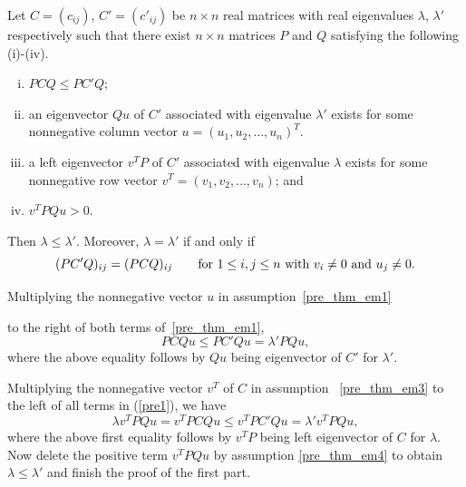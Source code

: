 \documentclass{beamer}
\begin{document}
\begin{frame}
    \begin{theorem}
        \label{pre_thm}
        Let $C=(c_{ij})$, $C'=(c'_{ij})$  be $n\times n$ real matrices
         with real eigenvalues $\lambda$, $\lambda'$ respectively such
         that there exist $n\times n$ matrices $P$ and $Q$   satisfying the following (i)-(iv).
    \begin{enumerate}[(i)]
        \item \label{pre_thm_em1}  $PCQ\leq PC'Q$;
        \item \label{pre_thm_em2} an eigenvector $Qu$ of $C'$  associated with
         eigenvalue $\lambda'$ exists for some nonnegative column vector
          $u=(u_1, u_2, \ldots, u_n)^T$.
        \item \label{pre_thm_em3} a left eigenvector $v^TP$ of $C'$ associated
         with eigenvalue $\lambda$ exists for some nonnegative row vector
         $v^T=(v_1, v_2, \ldots, v_n)$; and
        \item \label{pre_thm_em4} $v^TPQu>0.$
    \end{enumerate}
        Then $\lambda\leq \lambda'$. Moreover, $\lambda=\lambda'$ if and only if
        \begin{equation}\label{pre0}
            (PC'Q)_{ij}=(PCQ)_{ij}\qquad \hbox{for~}1\leq i, j\leq n \hbox{~with~} v_i\ne 0 \hbox{~and~} u_j\ne 0.
        \end{equation}
    \end{theorem}
\end{frame}

\begin{frame}
    Multiplying the nonnegative vector $u$ in assumption~\ref{pre_thm_em1}
    
    to the right of both terms of~\ref{pre_thm_em1},
    \begin{equation}\label{pre1}
       PCQu\leq PC'Qu=\lambda'PQu,
    \end{equation}
 where the above equality follows by $Qu$ being eigenvector of $C'$ for $\lambda'$.
\end{frame}

\begin{frame}
    Multiplying the nonnegative vector $v^T$ of $C$ in assumption
     ~\ref{pre_thm_em3} to the left of all terms  in (\ref{pre1}), we have
    \begin{equation}\label{pre2}
        \lambda v^TPQu=v^TPCQu\leq v^TPC'Qu=\lambda' v^TPQu,
    \end{equation}
    where the above first equality follows by $v^TP$ being
    left eigenvector of $C$ for $\lambda$.
    Now delete the positive term $v^TPQu$ by assumption \ref{pre_thm_em4} to obtain
        $\lambda\leq \lambda'$ and finish the proof of the first part.
\end{frame}
\end{document}
